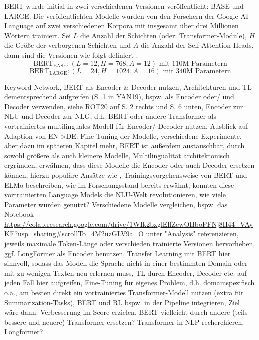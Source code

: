 \noindent
\ac{BERT} wurde initial in zwei verschiedenen Versionen veröffentlicht: BASE und LARGE. Die veröffentlichten Modelle wurden von den Forschern der Google AI Language auf zwei verschiedenen Korpora mit insgesamt über drei Millionen Wörtern trainiert. Sei $L$ die Anzahl der Schichten (oder: Transformer-Module), $H$ die Größe der verborgenen Schichten und $A$ die Anzahl der Self-Attention-Heads, dann sind die Versionen wie folgt definiert \cite[S.~3-5]{DEV19}. $$\text{BERT}_{\text{BASE}}: (L=12, H=768, A=12) \text{ mit } 110 \text{M Parametern}$$ $$\text{BERT}_{\text{LARGE}}: (L=24, H=1024, A=16) \text{ mit } 340 \text{M Parametern}$$


\newpage
Keyword Network, BERT als Encoder \& Decoder nutzen, Architekturen und TL dementsprechend aufgreifen (S. 1 in YAN19), bspw. als Encoder oder/ und Decoder verwenden, siehe ROT20 auf S. 2 rechts und S. 6 unten, Encoder zur NLU und Decoder zur NLG, d.h. BERT oder andere Transformer als vortrainiertes multilinguales Modell für Encoder/ Decoder nutzen, Ausblick auf Adaption von EN->DE: Fine-Tuning der Modelle, verschiedene Experimente, aber dazu im späteren Kapitel mehr, BERT ist außerdem austauschbar, durch sowohl größere als auch kleinere Modelle, Multilingualität architektonisch ergründen, erwähnen, dass diese Modelle die Encoder oder auch Decoder ersetzen können, hierzu populäre Ansätze wie \cite{ROT20}, Trainingsvorgehensweise von BERT und ELMo beschreiben, wie im Forschungsstand bereits erwähnt, konnten diese vortrainierten Language Models die NLU-Welt revolutionieren, wie viele Parameter wurden genutzt? Verschiedene Modelle vergleichen, bspw. das Notebook \url{https://colab.research.google.com/drive/1WIk2bxglElfZewOHboPFNj8H44_VAyKE?usp=sharing#scrollTo=4M2uzGLV9a_O} unter "Analysis" referenzieren, jeweils maximale Token-Länge oder verschieden trainierte Versionen hervorheben, ggf. LongFormer als Encoder benutzen, Transfer Learning mit BERT hier sinnvoll, sodass das Modell die Sprache nicht in einer bestimmten Domain oder mit zu wenigen Texten neu erlernen muss, TL durch Encoder, Decoder etc. auf jeden Fall hier aufgreifen, Fine-Tuning für eigenes Problem, d.h. domainspezifisch o.ä., am besten direkt ein vortrainiertes Transformer-Modell nutzen (extra für Summarization-Tasks), BERT und RL bspw. in der Pipeline integrieren, Ziel wäre dann: Verbesserung im Score erzielen, BERT vielleicht durch andere (teils bessere und neuere) Transformer ersetzen? Transformer in NLP recherchieren, Longformer?
